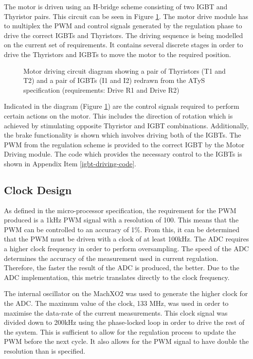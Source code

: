 The motor is driven using an H-bridge scheme consisting of two IGBT and Thyristor pairs. This circuit can be seen in Figure \ref{motor_control_circuit}. The motor drive module has to multiplex the PWM and control signals generated by the regulation phase to drive the correct IGBTs and Thyristors. The driving sequence is being modelled on the current set of requirements. It contains several discrete stages in order to drive the Thyristors and IGBTs to move the motor to the required position.

\begin{figure}
\centering

\caption{Motor driving circuit diagram showing a pair of Thyristors (T1 and T2) and a pair of IGBTs (I1 and I2) redrawn from the ATyS specification (requirements: Drive R1 and Drive R2)}
\label{motor_control_circuit}
\end{figure}


Indicated in the diagram (Figure \ref{motor_control_circuit}) are the control signals required to perform certain actions on the motor. This includes the direction of rotation which is achieved by stimulating opposite Thyristor and IGBT combinations. Additionally, the brake functionality is shown which involves driving both of the IGBTs. The PWM from the regulation scheme is provided to the correct IGBT by the Motor Driving module. The code which provides the necessary control to the IGBTs is shown in Appendix Item \ref{igbt-driving-code}.

\subsection{Clock Design}

As defined in the micro-processor specification, the requirement for the PWM produced is a 1kHz PWM signal with a resolution of 100. This means that the PWM can be controlled to an accuracy of 1\%. From this, it can be determined that the PWM must be driven with a clock of at least 100kHz. The ADC requires a higher clock frequency in order to perform oversampling. The speed of the ADC determines the accuracy of the measurement used in current regulation. Therefore, the faster the result of the ADC is produced, the better. Due to the ADC implementation, this metric translates directly to the clock frequency. 

The internal oscillator on the MachXO2 was used to generate the higher clock for the ADC. The maximum value of the clock, 133 MHz, was used in order to maximise the data-rate of the current measurements. This clock signal was divided down to 200kHz using the phase-locked loop in order to drive the rest of the system. This is sufficient to allow for the regulation process to update the PWM before the next cycle. It also allows for the PWM signal to have double the resolution than is specified.


